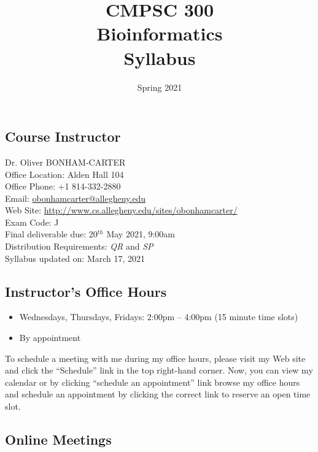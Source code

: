\documentclass[11pt]{article} %
\title{\textbf{CMPSC 300\\ Bioinformatics\\ Syllabus}}
\author{Spring 2021}
\date{} %
\begin{document}
\maketitle

\subsection*{\textbf{Course Instructor}}
Dr. Oliver BONHAM-CARTER\\
\noindent Office Location: Alden Hall 104 \\
\noindent Office Phone: +1 814-332-2880 \\
\noindent Email: \url{obonhamcarter@allegheny.edu} \\
\noindent Web Site: \url{http://www.cs.allegheny.edu/sites/obonhamcarter/} \\
\noindent Exam Code: J\\
\noindent Final deliverable due: 20$^{th}$ May 2021, 9:00am\\
\noindent Distribution Requirements: \emph{QR} and \emph{SP}\\
\noindent Syllabus updated on: March 17, 2021 %


\subsection*{\textbf{Instructor's Office Hours}}

\begin{itemize}
  \itemsep 0em
  \item Wednesdays, Thursdays, Fridays: 2:00pm -- 4:00pm (15 minute time slots)
  \item By appointment
\end{itemize}

\noindent
To schedule a meeting with me during my office hours, please visit my Web site and click the ``Schedule'' link in the top right-hand corner. Now, you can view my calendar or by clicking ``schedule an appointment'' link browse my office hours and schedule an appointment by clicking the correct link to reserve an open time slot. 



\subsection*{\textbf{Online Meetings}}
\label{sec:meet}
\end{document}
